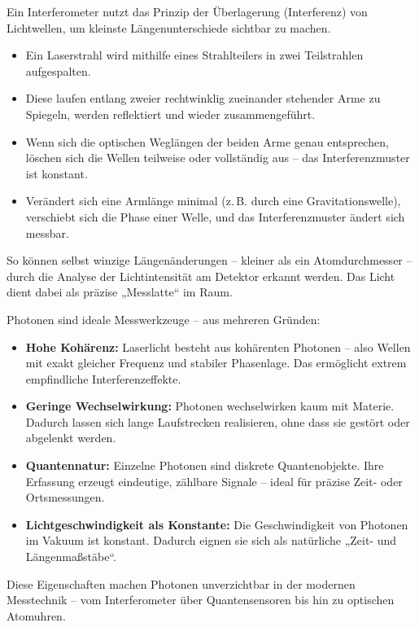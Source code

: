 \medskip
\begin{tcolorbox}[didaktikbox, title=Wie funktioniert ein Interferometer? \label{box:interferometer}]
	\small
	Ein Interferometer nutzt das Prinzip der Überlagerung (Interferenz) von Lichtwellen, um kleinste Längenunterschiede sichtbar zu machen. 
	
	\begin{itemize}
		\item Ein Laserstrahl wird mithilfe eines Strahlteilers in zwei Teilstrahlen aufgespalten.
		\item Diese laufen entlang zweier rechtwinklig zueinander stehender Arme zu Spiegeln, werden reflektiert und wieder zusammengeführt.
		\item Wenn sich die optischen Weglängen der beiden Arme genau entsprechen, löschen sich die Wellen teilweise oder vollständig aus – das Interferenzmuster ist konstant.
		\item Verändert sich eine Armlänge minimal (z.\,B. durch eine Gravitationswelle), verschiebt sich die Phase einer Welle, und das Interferenzmuster ändert sich messbar.
	\end{itemize}
	
	So können selbst winzige Längenänderungen – kleiner als ein Atomdurchmesser – durch die Analyse der Lichtintensität am Detektor erkannt werden. Das Licht dient dabei als präzise „Messlatte“ im Raum.
\end{tcolorbox}

\medskip
\begin{tcolorbox}[didaktikbox, title=Warum sind Photonen so genau messbar? \label{box:photonen_genau}]
	\small
	Photonen sind ideale Messwerkzeuge – aus mehreren Gründen:
	
	\begin{itemize}
		\item \textbf{Hohe Kohärenz:} Laserlicht besteht aus kohärenten Photonen – also Wellen mit exakt gleicher Frequenz und stabiler Phasenlage. Das ermöglicht extrem empfindliche Interferenzeffekte.
		\item \textbf{Geringe Wechselwirkung:} Photonen wechselwirken kaum mit Materie. Dadurch lassen sich lange Laufstrecken realisieren, ohne dass sie gestört oder abgelenkt werden.
		\item \textbf{Quantennatur:} Einzelne Photonen sind diskrete Quantenobjekte. Ihre Erfassung erzeugt eindeutige, zählbare Signale – ideal für präzise Zeit- oder Ortsmessungen.
		\item \textbf{Lichtgeschwindigkeit als Konstante:} Die Geschwindigkeit von Photonen im Vakuum ist konstant. Dadurch eignen sie sich als natürliche „Zeit- und Längenmaßstäbe“.
	\end{itemize}
	
	Diese Eigenschaften machen Photonen unverzichtbar in der modernen Messtechnik – vom Interferometer über Quantensensoren bis hin zu optischen Atomuhren.
\end{tcolorbox}

